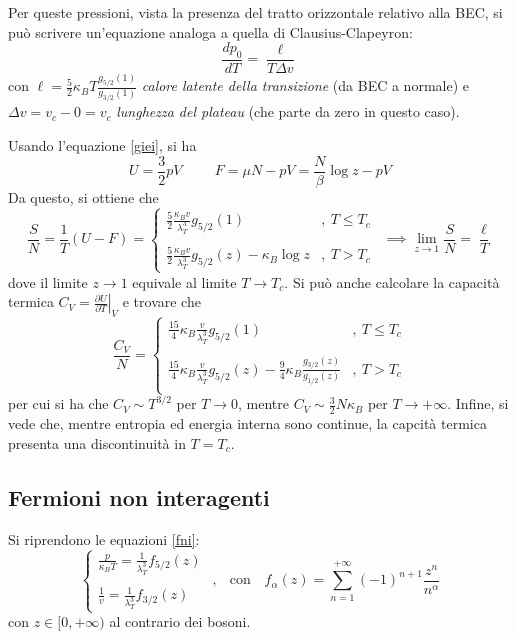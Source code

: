 \documentclass[11pt, a4paper]{scrartcl}
\theoremstyle{style}
\theoremstyle{style1}
\newcommand*\Eval[3]{\left.#1\right\rvert_{#2}^{#3}}
\numberwithin{equation}{subsection}
\begin{document}
Per queste pressioni, vista la presenza del tratto orizzontale relativo alla BEC, si pu\`o scrivere un'equazione analoga a quella di Clausius-Clapeyron:
\[
\frac{d p_0}{d T}  = \frac{\ell }{T \Delta v}
\] 
con $ \ell = \frac{5}{2}\kappa _B T \frac{g_{5 / 2} (1)}{g_{3 / 2} (1)}$ \textit{calore latente della transizione} (da BEC a normale) e $\Delta v = v_c - 0=v_c$ \textit{lunghezza del plateau} (che parte da zero in questo caso).

Usando l'equazione \ref{giei}, si ha 
\[
U = \frac{3}{2}pV \hspace{1cm} F = \mu N - pV = \frac{N}{\beta } \log z- pV
\] 
Da questo, si ottiene che 
\[
\frac{S}{N} = \frac{1}{T} (U - F) = \begin{cases}
	\displaystyle \frac{5}{2} \frac{\kappa _B v}{\lambda _T^3}g_{5 / 2} (1) &,\ T\le T_c\\
	\\
	\displaystyle \frac{5}{2} \frac{\kappa _B v}{\lambda _T^3}g_{5 / 2} (z) - \kappa _B \log z &,\ T>T_c
\end{cases} \ \ \implies \lim_{z \to 1} \frac{S}{N} = \frac{\ell}{T}
\] 
dove il limite $z\to 1$ equivale al limite $T\to T_c$.
Si pu\`o anche calcolare la capacit\`a termica $C_V = \Eval{\frac{\partial U}{\partial T}}{V}{} $ e trovare che 
\[
\frac{C_V}{N} = \begin{cases}
	\displaystyle \frac{15}{4} \kappa _B \frac{v}{\lambda _T^3}g_{5 / 2} (1) &,\ T\le T_c\\
	\\
	\displaystyle \frac{15}{4} \kappa _B \frac{v}{\lambda _T^3}g_{5 / 2} (z)-\frac{9}{4}\kappa _B \frac{g_{3 / 2} (z)}{g_{1 / 2} (z)} &,\ T> T_c\\
\end{cases}
\] 
per cui si ha che $C_V \sim T^{3 / 2}$ per $T\to 0$, mentre $C_V \sim \frac{3}{2}N\kappa _B$ per $T\to +\infty$.
Infine, si vede che, mentre entropia ed energia interna sono continue, la capcit\`a termica presenta una discontinuit\`a in $T=T_c$.

\subsection{Fermioni non interagenti}
Si riprendono le equazioni \ref{fni}:
\[
\begin{cases}
	\displaystyle \frac{p}{\kappa _B T} = \frac{1}{\lambda _T^3}f_{5 / 2} (z)\\
\\
\displaystyle \frac{1}{v}= \frac{1}{\lambda _T^3}f_{3 / 2} (z)
\end{cases}\ \, , \ \ \text{ con } \ \ \ f_{\alpha } (z) = \sum_{n=1}^{+\infty} (-1)^{n+1} \frac{z^n}{n^\alpha }
\] 
con $z \in [ 0,+\infty ) $ al contrario dei bosoni.
\vspace{.5cm}
\end{document}
